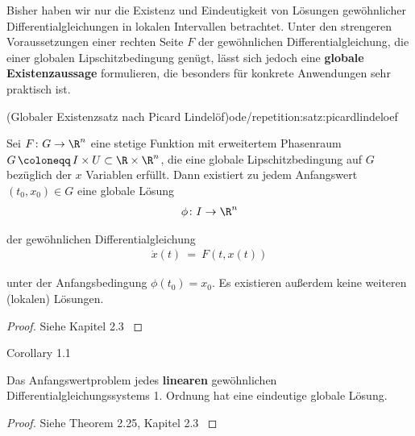 \documentclass[letterpaper,10pt,english]{jupyterBook}
\begin{document}
\par
Bisher haben wir nur die Existenz und Eindeutigkeit von Lösungen gewöhnlicher Differentialgleichungen in lokalen Intervallen betrachtet.
Unter den strengeren Voraussetzungen einer rechten Seite \(F\) der gewöhnlichen Differentialgleichung, die einer globalen Lipschitzbedingung genügt, lässt sich jedoch eine \textbf{globale Existenzaussage} formulieren, die besonders für konkrete Anwendungen sehr praktisch ist.
\begin{theorem}{(Globaler Existenzsatz nach Picard Lindelöf)}{ode/repetition:satz:picardlindeloef}



\par
Sei \(F\colon G\to\R^n\) eine stetige Funktion mit erweitertem Phasenraum \(G \, \coloneqq \, I \times U \subset \R\times\R^n\), die eine globale Lipschitzbedingung auf \(G\) bezüglich der \(x\) Variablen erfüllt.
Dann existiert zu jedem Anfangswert \((t_0,x_0) \in G\) eine globale Lösung
\begin{align*}
\phi \colon I \to \R^n
\end{align*}
\par
der gewöhnlichen Differentialgleichung
\begin{align*}
\dot{x}(t) \ = \ F(t,x(t))
\end{align*}
\par
unter der Anfangsbedingung \(\phi(t_0)=x_0\).
Es existieren außerdem keine weiteren (lokalen) Lösungen.
\end{theorem}

\begin{proof}
 Siehe Kapitel 2.3 \cite{Kna13}
\end{proof}
\label{ode/repetition:cor:eindeutigkeitlinear}
\begin{emphBox}{}{}{Corollary 1.1}



\par
Das Anfangswertproblem jedes \textbf{linearen} gewöhnlichen Differentialgleichungssystems 1. Ordnung hat eine eindeutige globale Lösung.
\end{emphBox}

\begin{proof}
 Siehe Theorem 2.25, Kapitel 2.3 \cite{Kna13}
\end{proof}
\end{document}
